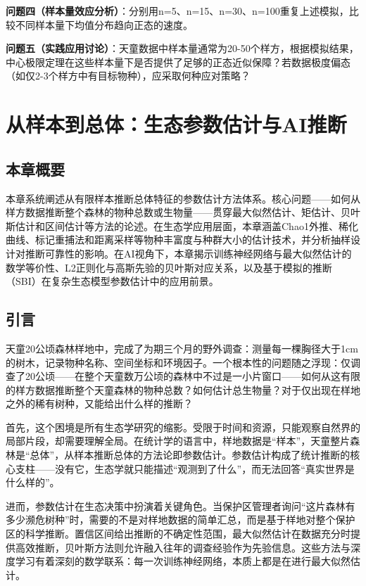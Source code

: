 \documentclass[
  twoside,12pt,fontset=none]{ctexbook}
\begin{document}
\textbf{问题四（样本量效应分析）}：分别用n=5、n=15、n=30、n=100重复上述模拟，比较不同样本量下均值分布趋向正态的速度。

\textbf{问题五（实践应用讨论）}：天童数据中样本量通常为20-50个样方，根据模拟结果，中心极限定理在这些样本量下是否提供了足够的正态近似保障？若数据极度偏态（如仅2-3个样方中有目标物种），应采取何种应对策略？

\hypertarget{ch04}{%
\chapter{从样本到总体：生态参数估计与AI推断}\label{ch04}}

\hypertarget{ux672cux7ae0ux6982ux8981-2}{%
\section{本章概要}\label{ux672cux7ae0ux6982ux8981-2}}

本章系统阐述从有限样本推断总体特征的参数估计方法体系。核心问题------如何从样方数据推断整个森林的物种总数或生物量------贯穿最大似然估计、矩估计、贝叶斯估计和区间估计等方法的论述。在生态学应用层面，本章涵盖Chao1外推、稀化曲线、标记重捕法和距离采样等物种丰富度与种群大小的估计技术，并分析抽样设计对推断可靠性的影响。在AI视角下，本章揭示训练神经网络与最大似然估计的数学等价性、L2正则化与高斯先验的贝叶斯对应关系，以及基于模拟的推断（SBI）在复杂生态模型参数估计中的应用前景。

\hypertarget{ux5f15ux8a00-2}{%
\section{引言}\label{ux5f15ux8a00-2}}

天童20公顷森林样地中，完成了为期三个月的野外调查：测量每一棵胸径大于1cm的树木，记录物种名称、空间坐标和环境因子。一个根本性的问题随之浮现：仅调查了20公顷------在整个天童数万公顷的森林中不过是一小片窗口------如何从这有限的样方数据推断整个天童森林的物种总数？如何估计总生物量？对于仅出现在样地之外的稀有树种，又能给出什么样的推断？

首先，这个困境是所有生态学研究的缩影。受限于时间和资源，只能观察自然界的局部片段，却需要理解全局。在统计学的语言中，样地数据是``样本''，天童整片森林是``总体''，从样本推断总体的方法论即参数估计。参数估计构成了统计推断的核心支柱------没有它，生态学就只能描述``观测到了什么''，而无法回答``真实世界是什么样的''。

进而，参数估计在生态决策中扮演着关键角色。当保护区管理者询问``这片森林有多少濒危树种''时，需要的不是对样地数据的简单汇总，而是基于样地对整个保护区的科学推断。置信区间给出推断的不确定性范围，最大似然估计在数据充分时提供高效推断，贝叶斯方法则允许融入往年的调查经验作为先验信息。这些方法与深度学习有着深刻的数学联系：每一次训练神经网络，本质上都是在进行最大似然估计。
\end{document}
